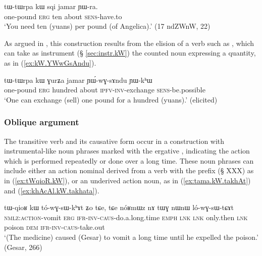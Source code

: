  \begin{exe} 
\ex \label{ex:tWtWrpa.kW1}
\gll  tɯ-tɯrpa kɯ sqi jamar ɲɯ-ra. \\
one-pound \textsc{erg} ten about \textsc{sens}-have.to \\
\glt `You need ten (yuans) per pound (of Angelica).' (17 ndZWnW, 22)
\end{exe}  

As argued in \citet[23]{jacques16comparative}, this construction results from the elision of a verb such as , which can take as instrument (§ \ref{sec:instr.kW}) the counted noun expressing a quantity, as in (\ref{ex:kW.YWwGsAndu}).


  \begin{exe}
\ex \label{ex:kW.YWwGsAndu}
\gll tɯ-tɯrpa kɯ ɣurʑa jamar ɲɯ́-wɣ-sɤndu ɲɯ-kʰɯ \\
one-pound \textsc{erg} hundred about \textsc{ipfv-inv}-exchange \textsc{sens}-be.possible \\
\glt `One can exchange (sell) one pound for a hundred (yuans).' (elicited)
\end{exe}


\subsubsection{Oblique argument} \label{sec:oblique.kW}
 The transitive verb  and its causative form  occur in a construction with instrumental-like noun phrases marked with the ergative , indicating the action which is performed repeatedly or done over a long time. These noun phrases can include either an action nominal derived from a verb with the prefix  (§ XXX) as in (\ref{ex:tWqioR.kW}), or an underived action noun, as in (\ref{ex:tama.kW.takhAt}) and (\ref{ex:khAcAl.kW.takhata}).  
 
  \begin{exe}
\ex \label{ex:tWqioR.kW}
\gll tɯ-qioʁ kɯ tó-wɣ-sɯ-kʰɤt ʑo tɕe, tɕe nóʁmɯz nɤ tɯɣ nɯnɯ ló-wɣ-sɯ-tɕɤt  \\
\textsc{nmlz:action}-vomit \textsc{erg} \textsc{ifr-inv-caus}-do.a.long.time \textsc{emph} \textsc{lnk} \textsc{lnk} only.then \textsc{lnk} poison \textsc{dem} \textsc{ifr-inv-caus}-take.out \\
\glt `(The medicine) caused (Gesar) to vomit a long time until he expelled the poison.' (Gesar, 266)
\end{exe}

